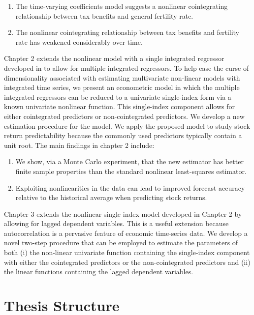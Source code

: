 \documentclass[a4paper,12pt,times,numbered,print,index]{report}
\numberwithin{equation}{section}
\begin{document}
	\begin{enumerate}
		\item The time-varying coefficients model suggests a nonlinear cointegrating relationship between tax benefits and general fertility rate.
		
		\item The nonlinear cointegrating relationship between tax benefits and fertility rate has weakened considerably over time.
	\end{enumerate}
	
	
	Chapter 2 extends the nonlinear model with a single integrated regressor
	developed in \cite{park2001nonlinear}  to allow for multiple
	integrated regressors. To help ease the curse of dimensionality associated
	with estimating multivariate non-linear models with integrated time series, we present
	an econometric model in which the multiple integrated regressors can be
	reduced to a univariate single-index form via a known univariate nonlinear
	function. This single-index component allows for either cointegrated
	predictors or non-cointegrated predictors. We develop a new estimation
	procedure for the model. We apply the proposed model to study stock return predictability because the commonly used predictors typically contain a unit root. 
	The main findings in chapter 2 include:
	\begin{enumerate}
		\item We show, via a Monte Carlo experiment, that the new estimator has
		better finite sample properties than the standard nonlinear least-squares
		estimator. 
		
		\item Exploiting nonlinearities in the data can lead to improved forecast accuracy relative to the historical average when predicting stock returns. 
		
	\end{enumerate}
	
	Chapter 3 extends the nonlinear single-index model developed in Chapter 2 by
	allowing for lagged dependent variables. This is a useful extension because
	autocorrelation is a pervasive feature of economic time-series data. We
	develop a novel two-step procedure that can be employed to estimate the parameters of both (i) the non-linear univariate function containing the single-index component with either the cointegrated predictors or the non-cointegrated predictors and (ii) the linear functions containing the lagged dependent variables. 
	
	
	\section{Thesis Structure}
\end{document}
